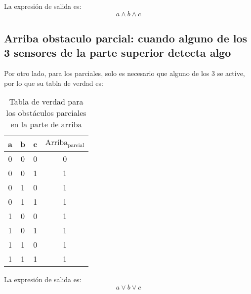 La expresión de salida es:
\begin{equation*}
    a \wedge b \wedge c
\end{equation*}
\subsection{Arriba obstaculo parcial: cuando alguno de los 3 sensores de la parte superior detecta algo}
Por otro lado, para los parciales, solo es necesario que alguno de los 3 se active, por lo que su tabla de verdad es:
\begin{table}[!ht]
    \centering
    \begin{tabular}{|c|c|c|c|}
        \hline
        a & b & c & $\text{Arriba}_{\text{parcial}}$\\
        \hline
        0 & 0 & 0 & 0 \\
        \hline
        0 & 0 & 1 & 1 \\
        \hline
        0 & 1 & 0 & 1 \\
        \hline
        0 & 1 & 1 & 1 \\
        \hline
        1 & 0 & 0 & 1 \\
        \hline
        1 & 0 & 1 & 1 \\
        \hline
        1 & 1 & 0 & 1 \\
        \hline
        1 & 1 & 1 & 1 \\
        \hline
    \end{tabular}
    \caption{Tabla de verdad para los obstáculos parciales en la parte de arriba}\label{table:arriba-parcial}
\end{table}

\vspace{1cm}
La expresión de salida es:
\begin{equation*}
    a \vee b \vee c
\end{equation*}

\vspace{2cm}

